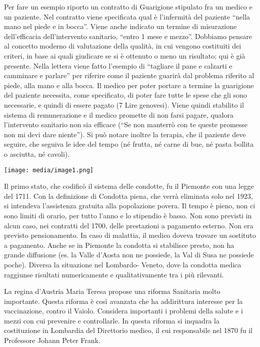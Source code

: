 \documentclass[]{article}
\begin{document}
Per fare un esempio riporto un contratto di Guarigione stipulato fra un
medico e un paziente. Nel contratto viene specificata qual è l'infermità
del paziente ``nella mano nel piede e in bocca''. Viene anche indicato
un termine di misurazione dell'efficacia dell'intervento sanitario,
``entro 1 mese e mezzo''. Dobbiamo pensare al concetto moderno di
valutazione della qualità, in cui vengono costituiti dei criteri, in
base ai quali giudicare se si è ottenuto o meno un risultato; qui è già
presente. Nella lettera viene fatto l'esempio di ``tagliare il pane e
calzarti e camminare e parlare'' per riferire come il paziente guarirà
dal problema riferito al piede, alla mano e alla bocca. Il medico per
poter portare a termine la guarigione del paziente necessita, come
specificato, di poter fare tutte le spese che gli sono necessarie, e
quindi di essere pagato (7 Lire genovesi). Viene quindi stabilito il
sistema di remunerazione e il medico promette di non farsi pagare,
qualora l'intervento sanitario non sia efficace (``Se non manterrò con
te queste promesse non mi devi dare niente''). Si può notare inoltre la
terapia, che il paziente deve seguire, che seguiva le idee del tempo (né
frutta, né carne di bue, né pasta bollita o asciutta, né cavoli).

\texttt{[image: media/image1.png]}

Il primo stato, che codificò il sistema delle condotte, fu il Piemonte
con una legge del 1711. Con la definizione di Condotta piena, che verrà
eliminata solo nel 1923, si intendeva l'assistenza gratuita alla
popolazione povera. Il tempo è pieno, non ci sono limiti di orario, per
tutto l'anno e lo stipendio è basso. Non sono previsti in alcun caso,
nei contratti del 1700, delle prestazioni a pagamento esterno. Non era
previsto pensionamento. In caso di malattia, il medico doveva trovare un
sostituto a pagamento. Anche se in Piemonte la condotta si stabilisce
presto, non ha grande diffusione (es. la Valle d'Aosta non ne possiede,
la Val di Susa ne possiede poche). Diversa la situazione nel Lombardo-
Veneto, dove la condotta medica raggiunse risultati numericamente e
qualitativamente tra i più rilevanti.

La regina d'Austria Maria Teresa propose una riforma Sanitaria molto
importante. Questa riforma è così avanzata che ha addirittura interesse
per la vaccinazione, contro il Vaiolo. Considera importanti i problemi
della salute e i mezzi con cui prevenire e controllarle. In questa
riforma si inquadra la costituzione in Lombardia del Direttorio medico,
il cui responsabile nel 1870 fu il Professore Johann Peter Frank.
\end{document}
